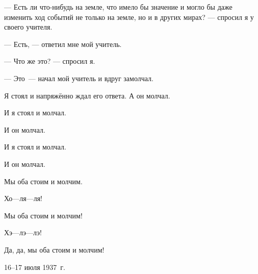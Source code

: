 --- Есть ли что-нибудь на земле, что имело бы значение и могло бы даже изменить ход событий не только на земле, но и в других мирах? --- спросил я у своего учителя.

--- Есть, --- ответил мне мой учитель.

--- Что же это? --- спросил я.

--- Это~--- начал мой учитель и вдруг замолчал.

Я стоял и напряжённо ждал его ответа. А он молчал.

И я стоял и молчал.

И он молчал.

И я стоял и молчал.

И он молчал.

Мы оба стоим и молчим.

Хо---ля---ля!

Мы оба стоим и молчим!

Хэ---лэ---лэ!

Да, да, мы оба стоим и молчим!

16--17 июля 1937~г.

